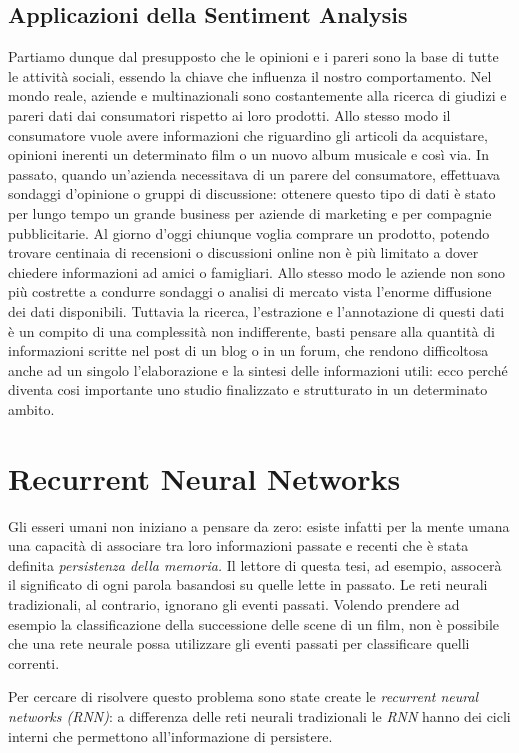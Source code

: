\documentclass[a4paper,12pt,openright,twoside]{report}
\theoremstyle{definition}
\begin{document}
\subsection{Applicazioni della Sentiment Analysis}
Partiamo dunque dal presupposto che le opinioni e i pareri sono la base di tutte le attività sociali,
 essendo la chiave che influenza il nostro comportamento. Nel mondo reale, aziende e multinazionali 
 sono costantemente alla ricerca di giudizi e pareri dati dai consumatori  rispetto ai loro prodotti. 
 Allo stesso modo il consumatore vuole avere informazioni che riguardino gli articoli da acquistare, 
 opinioni inerenti un determinato film o un nuovo album musicale e così via. In passato, quando un’azienda 
 necessitava di un parere del consumatore, effettuava sondaggi d’opinione o gruppi di discussione: 
 ottenere questo tipo di dati è stato per lungo tempo un grande business per aziende di marketing e 
 per compagnie pubblicitarie.
Al giorno d’oggi chiunque voglia comprare un prodotto, potendo trovare centinaia di recensioni o 
discussioni online non è più limitato a dover chiedere informazioni ad amici o famigliari. 
Allo stesso modo le aziende non sono più costrette a condurre sondaggi o analisi di mercato vista 
l’enorme diffusione dei dati disponibili. Tuttavia la ricerca, l’estrazione e l’annotazione di questi 
dati è un compito di una complessità non indifferente, basti pensare alla quantità di informazioni 
scritte nel post di un blog o in un forum, che rendono difficoltosa anche ad un singolo l'elaborazione 
e la sintesi delle informazioni utili: ecco perché diventa cosi importante uno studio finalizzato e 
strutturato in un determinato ambito.


\section{Recurrent Neural Networks}
Gli esseri umani non iniziano a pensare da zero: esiste infatti per la mente umana una capacità di 
associare tra loro informazioni passate e recenti che è stata definita \emph{persistenza della memoria.} 
Il lettore di questa tesi, ad esempio, assocerà il significato di ogni parola basandosi su quelle 
lette in passato.
Le reti neurali tradizionali, al contrario,  ignorano gli eventi passati. Volendo prendere ad esempio 
la classificazione della successione delle scene di un film, non è possibile che una rete neurale 
possa utilizzare gli eventi passati per classificare quelli correnti.

Per cercare di risolvere questo problema sono state create le \emph{recurrent neural networks (RNN)}:
a differenza delle reti neurali tradizionali le \emph{RNN} hanno dei cicli interni che permettono
all'informazione di persistere.
\end{document}
